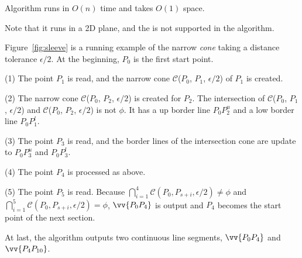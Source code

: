 Algorithm \cia runs in $O(n)$ time and takes $O(1)$ space.

Note that it runs in a 2D plane, and the \sed is not supported in the algorithm.



\begin{example}
\label{exm-alg-sleeve}
Figure~\ref{fig:sleeve} is a running example of the narrow \emph{cone} taking a distance tolerance $\epsilon/2$. At the beginning, $P_0$ is the first start point.

\sstab (1) The point $P_1$ is read, and the narrow cone $\mathcal{C}$($P_0$, $P_{1}$, $\epsilon/2$) of $P_1$ is created.

\sstab (2) The narrow cone $\mathcal{C}$($P_0$, $P_{2}$, $\epsilon/2$) is created for $P_2$. The intersection of $\mathcal{C}$($P_0$, $P_{1}$, $\epsilon/2$) and $\mathcal{C}$($P_0$, $P_{2}$, $\epsilon/2$) is not $\phi$. It has a up border line $P_0P_2^u$ and a low border line $P_0P_1^l$.

\sstab (3) The point $P_3$ is read, and the border lines of the intersection cone are update to $P_0P_3^u$ and $P_0P_3^l$.

\sstab (4) The point $P_4$ is processed as above.

\sstab (5) The point $P_5$ is read. Because $\bigcap_{i=1}^{4}\mathcal{C}(P_0, P_{s+i}, \epsilon/2) \ne \phi$ and $\bigcap_{i=1}^{5}\mathcal{C}(P_0, P_{s+i}, \epsilon/2) = \phi$, $\vv{P_0P_4}$ is output and $P_4$ becomes the start point of the next section.

At last, the algorithm outputs two continuous line segments, \ie $\vv{P_0P_4}$ and $\vv{P_4P_{10}}$.
\end{example}


















